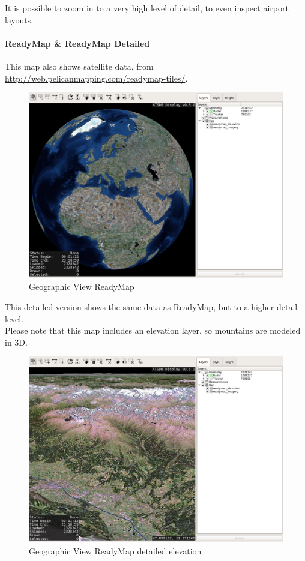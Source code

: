 It is possible to zoom in to a very high level of detail, to even inspect airport layouts.

\newpage
\paragraph{ReadyMap \& ReadyMap Detailed}

This map also shows satellite data, from \url{http://web.pelicanmapping.com/readymap-tiles/}.

\begin{figure}[H]
    \hspace*{-2.5cm}
    \includegraphics[width=19cm,frame]{figures/geoview_ready.png}
  \caption{Geographic View ReadyMap}
\end{figure}

This detailed version shows the same data as ReadyMap, but to a higher detail level. \\

Please note that this map includes an elevation layer, so mountains are modeled in 3D.

\begin{figure}[H]
    \hspace*{-2.5cm}
    \includegraphics[width=19cm]{figures/geoview_readymap_elav.png}
  \caption{Geographic View ReadyMap detailed elevation}
\end{figure}



